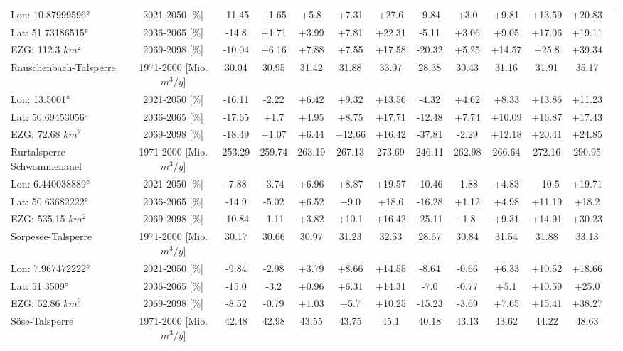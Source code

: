 \begin{longtable}{@{\extracolsep{\fill}}lc|ccccc||cccccc}
\cline{2-12} 
Lon: 10.87999596° & 2021-2050 [\%]  & -11.45 & +1.65 & +5.8 & +7.31 & +27.6 & -9.84 & +3.0 & +9.81 & +13.59 & +20.83\\ 
Lat: 51.73186515° & 2036-2065 [\%]  & -14.8 & +1.71 & +3.99 & +7.81 & +22.31 & -5.11 & +3.06 & +9.05 & +17.06 & +19.11\\ 
EZG: 112.3 $km^2$ & 2069-2098 [\%]  & -10.04 & +6.16 & +7.88 & +7.55 & +17.58 & -20.32 & +5.25 & +14.57 & +25.8 & +39.34\\ 
\hline 
Rauschenbach-Talsperre & 1971-2000 [Mio. $m^3/y$]  & 30.04 & 30.95 & 31.42 & 31.88 & 33.07 & 28.38 & 30.43 & 31.16 & 31.91 & 35.17\\ 
\cline{2-12} 
Lon: 13.5001° & 2021-2050 [\%]  & -16.11 & -2.22 & +6.42 & +9.32 & +13.56 & -4.32 & +4.62 & +8.33 & +13.86 & +11.23\\ 
Lat: 50.69453056° & 2036-2065 [\%]  & -17.65 & +1.7 & +4.95 & +8.75 & +17.71 & -12.48 & +7.74 & +10.09 & +16.87 & +17.43\\ 
EZG: 72.68 $km^2$ & 2069-2098 [\%]  & -18.49 & +1.07 & +6.44 & +12.66 & +16.42 & -37.81 & -2.29 & +12.18 & +20.41 & +24.85\\ 
\hline 
Rurtalsperre Schwammenauel & 1971-2000 [Mio. $m^3/y$]  & 253.29 & 259.74 & 263.19 & 267.13 & 273.69 & 246.11 & 262.98 & 266.64 & 272.16 & 290.95\\ 
\cline{2-12} 
Lon: 6.440038889° & 2021-2050 [\%]  & -7.88 & -3.74 & +6.96 & +8.87 & +19.57 & -10.46 & -1.88 & +4.83 & +10.5 & +19.71\\ 
Lat: 50.63682222° & 2036-2065 [\%]  & -14.9 & -5.02 & +6.52 & +9.0 & +18.6 & -16.28 & +1.12 & +4.98 & +11.19 & +18.2\\ 
EZG: 535.15 $km^2$ & 2069-2098 [\%]  & -10.84 & -1.11 & +3.82 & +10.1 & +16.42 & -25.11 & -1.8 & +9.31 & +14.91 & +30.23\\ 
\hline 
Sorpesee-Talsperre & 1971-2000 [Mio. $m^3/y$]  & 30.17 & 30.66 & 30.97 & 31.23 & 32.53 & 28.67 & 30.84 & 31.54 & 31.88 & 33.13\\ 
\cline{2-12} 
Lon: 7.967472222° & 2021-2050 [\%]  & -9.84 & -2.98 & +3.79 & +8.66 & +14.55 & -8.64 & -0.66 & +6.33 & +10.52 & +18.66\\ 
Lat: 51.3509° & 2036-2065 [\%]  & -15.0 & -3.2 & +0.96 & +6.31 & +14.31 & -7.0 & -0.77 & +5.1 & +10.59 & +25.0\\ 
EZG: 52.86 $km^2$ & 2069-2098 [\%]  & -8.52 & -0.79 & +1.03 & +5.7 & +10.25 & -15.23 & -3.69 & +7.65 & +15.41 & +38.27\\ 
\hline 
Söse-Talsperre & 1971-2000 [Mio. $m^3/y$]  & 42.48 & 42.98 & 43.55 & 43.75 & 45.1 & 40.18 & 43.13 & 43.62 & 44.22 & 48.63\\ 

\end{longtable}
